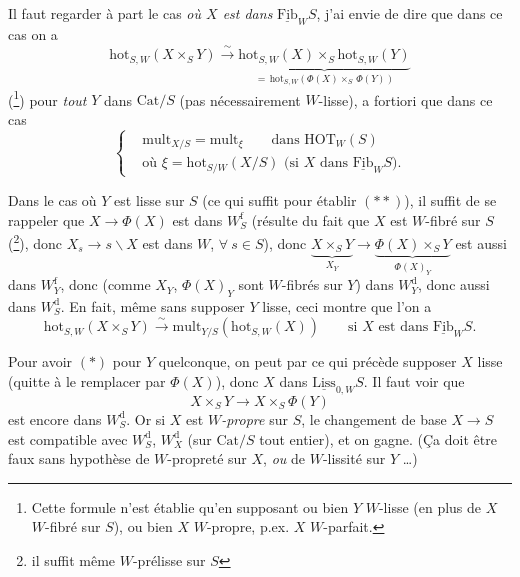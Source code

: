 \documentclass[11pt]{article}
\newcommand{\printedpage}[1]{\marginpar{\footnotesize p.~#1}}
\newcommand{\msp}[1]{\marginpar{\footnotesize [#1]}}
\begin{document}
Il faut regarder à part le cas \textit{où $X$ est dans} $\underline{\mathrm{Fib}}_W S$, j'ai envie de dire que dans ce cas on a
\[
\mathrm{hot}_{S,W}(X\times_S Y) \xrightarrow{\ \sim\ } \underbrace{\mathrm{hot}_{S,W}(X)\times_S \mathrm{hot}_{S,W}(Y)}_{=\,\mathrm{hot}_{S,W}(\Phi(X)\times_S\, \Phi(Y))} \tag*{$(*)$} %
\]
(\footnote{Cette formule n'est établie qu'en supposant ou bien $Y$ $W$-lisse (en plus de $X$ $W$-fibré sur $S$), ou bien $X$ $W$-propre, p.ex. $X$ $W$-parfait.}) pour \textit{tout} $Y$ dans $\mathrm{Cat}/S$ (pas nécessairement $W$-lisse), a fortiori que dans ce cas
\[
\left\{\begin{aligned}
&\mathrm{mult}_{X/S} = \mathrm{mult}_\xi \qquad \text{dans } \mathrm{HOT}_W(S)\\
&\text{où } \xi = \mathrm{hot}_{S/W}(X/S) \text{ (si $X$ dans $\underline{\mathrm{Fib}}_W S$).} %
\end{aligned}\right. \tag*{$(**)$}
\]

\printedpage{125}

Dans le cas où $Y$ est lisse sur $S$ (ce qui suffit pour établir $(**)$), il suffit de se rappeler que $X\longrightarrow \Phi(X)$ est dans $W_S^{\mathrm{f}}$ (résulte du fait que $X$ est $W$-fibré sur $S$ (\footnote{il suffit même $W$-prélisse sur $S$}), donc $X_s \longrightarrow s\backslash X$ est dans $W$, $\forall\ s\in S$), donc $\underbrace{X\times_S Y}_{X_Y} \longrightarrow \underbrace{\Phi(X)\times_S Y}_{\Phi(X)_Y}$ est aussi dans $W_Y^{\mathrm{f}}$, donc (comme $X_Y$, $\Phi(X)_Y$ sont $W$-fibrés sur $Y$) dans $W_Y^{\mathrm{d}}$, donc aussi dans $W_S^{\mathrm{d}}$. En fait, même sans supposer $Y$ lisse, ceci montre que l'on a
\msp{page 202}
\[
\mathrm{hot}_{S,W}(X\times_S Y) \xrightarrow{\ \sim\ } \mathrm{mult}_{Y/S}(\mathrm{hot}_{S,W}(X)) \qquad \text{si $X$ est dans $\underline{\mathrm{Fib}}_W S$.} \tag*{$(*)$}
\]

Pour avoir $(*)$ pour $Y$ quelconque, on peut par ce qui précède supposer $X$ lisse (quitte à le remplacer par $\Phi(X)$), donc $X$ dans $\underline{\mathrm{Liss}}_{0,W}S$. Il faut voir que
\[
X\times_S Y \longrightarrow X\times_S \Phi(Y)
\]
est encore dans $W_S^{\mathrm{d}}$. Or si $X$ est \textit{$W$-propre} sur $S$, le changement de base $X\longrightarrow S$ est compatible avec $W_S^{\mathrm{d}}$, $W_X^{\mathrm{d}}$ (sur $\mathrm{Cat}/S$ tout entier), et on gagne. (Ça doit être faux sans hypothèse de $W$-propreté sur $X$, \textit{ou} de $W$-lissité sur $Y$ \dots)
\end{document}
